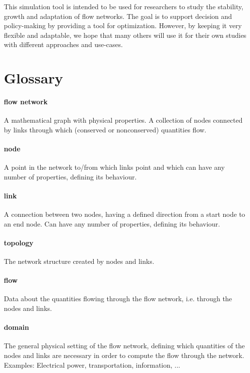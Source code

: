\documentclass[11pt,fleqn]{book} %
\newcommand{\domain}[1][]{domain#1}
\begin{document}
This simulation tool is intended to be used for researchers to study the stability, growth and adaptation of flow networks. The goal is to support decision and policy-making by providing a tool for optimization. However, by keeping it very flexible and adaptable, we hope that many others will use it for their own studies with different approaches and use-cases.



\section{Glossary}
\paragraph{flow network}
A mathematical graph with physical properties. A collection of nodes connected by links through which (conserved or nonconserved) quantities flow.

\paragraph{node}
A point in the network to/from which links point and which can have any number of properties, defining its behaviour.

\paragraph{link}
A connection between two nodes, having a defined direction from a start node to an end node. Can have any number of properties, defining its behaviour.

\paragraph{topology}
The network structure created by nodes and links.

\paragraph{flow}
Data about the quantities flowing through the flow network, i.e. through the nodes and links.

\paragraph{\domain{}}\index{\domain{}}
The general physical setting of the flow network, defining which quantities of the nodes and links are necessary in order to compute the flow through the network. Examples: Electrical power, transportation, information, ...
\end{document}
